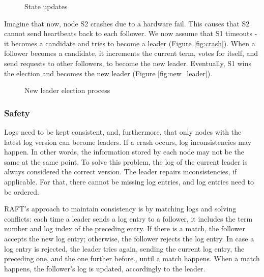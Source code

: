 \documentclass[12pt,a4paper]{article}
\begin{document}
\begin{figure}[h!]
    \centering
    \qquad
    \caption{State updates}%
    \label{fig:su_2}%
\end{figure}

Imagine that now, node S2 crashes due to a hardware fail. This causes that S2 cannot send heartbeats back to each follower. We now assume that S1 timeouts - it becomes a candidate and tries to become a leader (Figure \ref{fig:crash}). When a follower becomes a candidate, it increments the current term, votes for itself, and send requests to other followers, to become the new leader. Eventually, S1 wins the election and becomes the new leader (Figure \ref{fig:new_leader}).

\begin{figure}[h!]
    \centering
    \qquad
    \caption{New leader election process}%
    \label{fig:leader_election}%
\end{figure}


\subsubsection{Safety}
Logs need to be kept consistent, and, furthermore, that only nodes with the latest log version can become leaders. 
If a crash occurs, log inconsistencies may happen. In other words, the information stored by each node may not be the same at the same point. To solve this problem, the log of the current leader is always considered the correct version. The leader repairs inconsistencies, if applicable. For that, there cannot be missing log entries, and log entries need to be ordered.

RAFT's approach to maintain consistency is by matching logs and solving conflicts: each time a leader sends a log entry to a follower, it includes the term number and log index of the preceding entry. If there is a match, the follower accepts the new log entry; otherwise, the follower rejects the log entry. In case a log entry is rejected, the leader tries again, sending the current log entry, the preceding one, and the one further before., until a match happens. When a match happens, the follower's log is updated, accordingly to the leader.
\end{document}
